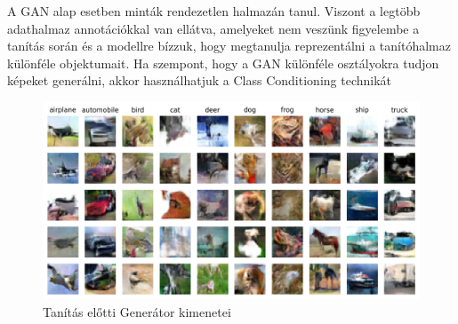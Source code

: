 
A GAN alap esetben minták rendezetlen halmazán tanul. Viszont a legtöbb adathalmaz annotációkkal van ellátva, amelyeket nem veszünk figyelembe a tanítás során és a modellre bízzuk, hogy megtanulja reprezentálni a tanítóhalmaz különféle objektumait. Ha szempont, hogy a GAN különféle osztályokra tudjon képeket generálni, akkor használhatjuk a Class Conditioning technikát \cite{mirza2014conditional}

\begin{figure}[h]
\centering
\includegraphics[width=13cm]{images/label_conditioning.png}
\caption{Tanítás előtti Generátor kimenetei}
\label{fig:labelconditioning}
\end{figure}